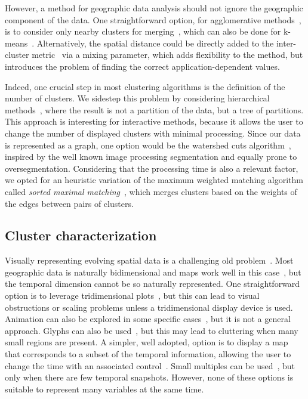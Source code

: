 However, a method for geographic data analysis should not ignore the geographic
component of the data. One straightforward option, for agglomerative
methods~\cite{han2001spatial}, is to consider only nearby clusters for
merging~\cite{Chavent2017}, which can also be done for
k-means~\cite{soor2018extending}. Alternatively, the spatial distance could be
directly added to the inter-cluster metric~\cite{Chavent2017} via a mixing
parameter, which adds flexibility to the method, but introduces the problem of
finding the correct application-dependent values.

Indeed, one crucial step in most clustering algorithms is the definition of the
number of clusters. We sidestep this problem by considering hierarchical
methods~\cite{soille2012morphological}, where the result is not a partition of
the data, but a tree of partitions. This approach is interesting for interactive
methods, because it allows the user to change the number of displayed clusters
with minimal processing. Since our data is represented as a graph, one option
would be the watershed cuts algorithm~\cite{Cousty2009}, inspired by the well
known image processing segmentation and equally prone to oversegmentation.
Considering that the processing time is also a relevant factor, we opted for an
heuristic variation of the maximum weighted matching algorithm called
\emph{sorted maximal matching}~\cite{markus2017}, which merges clusters based on
the weights of the edges between pairs of clusters.



\subsection{Cluster characterization}
Visually representing evolving spatial data is a challenging old
problem~\cite{monmonier1990strategies,andrienko2003exploratory,ferreira2015visual,Zheng2016}.
Most geographic data is naturally bidimensional and maps work well in this
case~\cite{Zheng2016,ward2015interactive}, but the temporal dimension cannot be
so naturally represented. One straightforward option is to leverage
tridimensional plots~\cite{andrienko2014visualization,Tominski2012a}, but this
can lead to visual obstructions or scaling problems unless a tridimensional
display device is used. Animation can also be explored in some specific
cases~\cite{buschmann2014real}, but it is not a general approach. Glyphs can
also be used~\cite{seebacher2017visual,Andrienko2017}, but this may lead to
cluttering when many small regions are present. A simpler, well adopted, option
is to display a map that corresponds to a subset of the temporal information,
allowing the user to change the time with an associated
control~\cite{Chen2017,Valdivia2015,Alce2018,Doraiswamy2014}. Small multiples
can be used~\cite{VonLandesberger2016}, but only when there are few temporal
snapshots. However, none of these options is suitable to represent many
variables at the same time.


